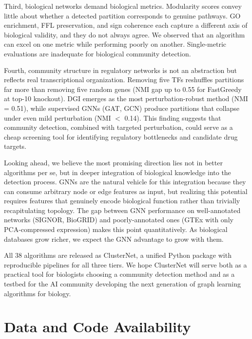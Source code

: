 \documentclass[11pt]{article}
\begin{document}
Third, biological networks demand biological metrics.
Modularity scores convey little about whether a detected partition corresponds to genuine pathways.
GO enrichment, FFL preservation, and sign coherence each capture a different axis of biological validity, and they do not always agree.
We observed that an algorithm can excel on one metric while performing poorly on another.
Single-metric evaluations are inadequate for biological community detection.

Fourth, community structure in regulatory networks is not an abstraction but reflects real transcriptional organization.
Removing five TFs reshuffles partitions far more than removing five random genes (NMI gap up to 0.55 for FastGreedy at top-10 knockout).
DGI emerges as the most perturbation-robust method (NMI = 0.51), while supervised GNNs (GAT, GCN) produce partitions that collapse under even mild perturbation (NMI $<$ 0.14).
This finding suggests that community detection, combined with targeted perturbation, could serve as a cheap screening tool for identifying regulatory bottlenecks and candidate drug targets.

Looking ahead, we believe the most promising direction lies not in better algorithms per se, but in deeper integration of biological knowledge into the detection process.
GNNs are the natural vehicle for this integration because they can consume arbitrary node or edge features as input, but realizing this potential requires features that genuinely encode biological function rather than trivially recapitulating topology.
The gap between GNN performance on well-annotated networks (SIGNOR, BioGRID) and poorly-annotated ones (GTEx with only PCA-compressed expression) makes this point quantitatively.
As biological databases grow richer, we expect the GNN advantage to grow with them.

All 38 algorithms are released as ClusterNet, a unified Python package with reproducible pipelines for all three tiers.
We hope ClusterNet will serve both as a practical tool for biologists choosing a community detection method and as a testbed for the AI community developing the next generation of graph learning algorithms for biology.


\section*{Data and Code Availability}
\end{document}
